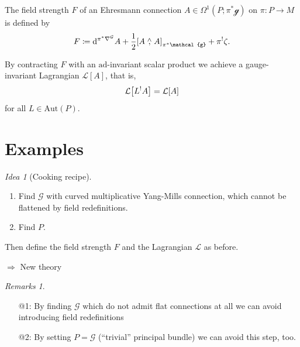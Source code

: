 \documentclass[
aspectratio=3218, 
10pt
]{beamer}
\def\bes{\begin{equation*}}
\def\ees{\end{equation*}}
\theoremstyle{plain}
\theoremstyle{remark}
\newtheorem*{remark}{Remarks}
\newtheorem*{idea}{Idea}
\begin{document}
{\begin{frame}
\begin{definition}\vspace{.5pt}
The field strength $F$ of an Ehresmann connection $A \in \Omega^1(P; \pi^*\mathcal{g})$ on $\pi \colon P \to M$ is defined by 
\bes
F
\coloneqq
\mathrm{d}^{\pi^*\nabla^{\mathcal{G}}} A
	+ \frac{1}{2} \mleft[ A \stackrel{\wedge}{,} A \mright]_{\pi^*\mathcal{g}}
	+ \pi^!\zeta.
\ees
\end{definition}
\pause
\begin{theorem}\vspace{.5pt}
By contracting $F$ with an $\mathup{ad}$-invariant scalar product we achieve a gauge-invariant Lagrangian $\mathcal{L}[A]$, that is,
\bes
\mathcal{L}\mleft[L^!A\mright]
=
\mathcal{L}[A]
\ees
for all $L \in \mathup{Aut}(P)$.
\end{theorem}
\end{frame}

\section{Examples}


\begin{frame}
\begin{idea}[Cooking recipe]
\begin{enumerate}
	\item Find $\mathcal{G}$ with curved multiplicative Yang-Mills connection, which cannot be flattened by field redefinitions.
	\item Find $P$.
\end{enumerate}
Then define the field strength $F$ and the Lagrangian $\mathcal{L}$ as before.

$\Rightarrow$ New theory \smiley
\end{idea}
\pause
\begin{remark}
\begin{enumerate}[leftmargin=10cm]
	\item[@1:] By finding $\mathcal{G}$ which do not admit flat connections at all we can avoid introducing field redefinitions
	\item[@2:] By setting $P = \mathcal{G}$ (``trivial'' principal bundle) we can avoid this step, too.
\end{enumerate}
\end{remark}
\end{frame}


}
\end{document}
